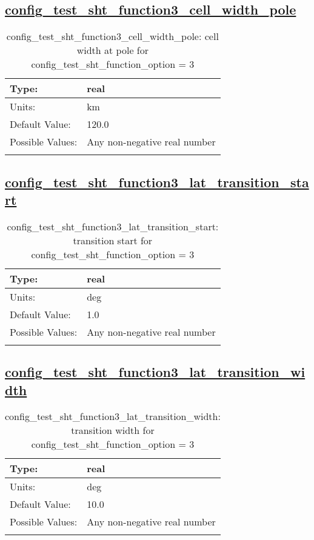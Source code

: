 \subsection[config\_test\_sht\_function3\_cell\_width\_pole]{\hyperref[sec:nm_tab_test_sht]{config\_test\_sht\_function3\_cell\_width\_pole}}
\label{subsec:nm_sec_config_test_sht_function3_cell_width_pole}
\begin{center}
\begin{longtable}{| p{2.0in} || p{4.0in} |}
    \hline
    Type: & real \\
    \hline
    Units: & \si{km} \\
    \hline
    Default Value: & 120.0 \\
    \hline
    Possible Values: & Any non-negative real number \\
    \hline
    \caption{config\_test\_sht\_function3\_cell\_width\_pole: cell width at pole for config\_test\_sht\_function\_option = 3}
\end{longtable}
\end{center}
\subsection[config\_test\_sht\_function3\_lat\_transition\_start]{\hyperref[sec:nm_tab_test_sht]{config\_test\_sht\_function3\_lat\_transition\_start}}
\label{subsec:nm_sec_config_test_sht_function3_lat_transition_start}
\begin{center}
\begin{longtable}{| p{2.0in} || p{4.0in} |}
    \hline
    Type: & real \\
    \hline
    Units: & \si{deg} \\
    \hline
    Default Value: & 1.0 \\
    \hline
    Possible Values: & Any non-negative real number \\
    \hline
    \caption{config\_test\_sht\_function3\_lat\_transition\_start: transition start for config\_test\_sht\_function\_option = 3}
\end{longtable}
\end{center}
\subsection[config\_test\_sht\_function3\_lat\_transition\_width]{\hyperref[sec:nm_tab_test_sht]{config\_test\_sht\_function3\_lat\_transition\_width}}
\label{subsec:nm_sec_config_test_sht_function3_lat_transition_width}
\begin{center}
\begin{longtable}{| p{2.0in} || p{4.0in} |}
    \hline
    Type: & real \\
    \hline
    Units: & \si{deg} \\
    \hline
    Default Value: & 10.0 \\
    \hline
    Possible Values: & Any non-negative real number \\
    \hline
    \caption{config\_test\_sht\_function3\_lat\_transition\_width: transition width for config\_test\_sht\_function\_option = 3}
\end{longtable}
\end{center}
